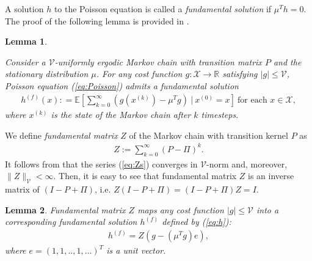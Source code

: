 \documentclass[11pt]{article}
\newcommand{\R}{\mathbb{R}}
\newcommand{\E}{\mathbb{E}}
\newcommand{\X}{\mathcal{X}}
\newcommand{\V}{\mathcal{V}}
\newtheorem{lemma}{Lemma}
\theoremstyle{definition}
\numberwithin{equation}{section}
\begin{document}




A solution $h$ to the Poisson equation is called a \textit{fundamental solution} if   $ \mu^T h =0.$    The proof of the following lemma is provided in \cite[Proposition A.3.11]{Meyn2007}.



\begin{lemma}\label{lem:poisson_sol}

Consider a $\V$-uniformly ergodic  Markov chain with transition matrix $P$ and the stationary  distribution $\mu$.
 For any cost function $g:\X \rightarrow \R$ satisfying $|g|\leq \V$,  Poisson equation (\ref{eq:Poisson}) admits a fundamental  solution
\begin{align}\label{eq:h}
h^{(f)}(x) : = \E \left[\sum\limits_{k=0}^\infty \left(g(x^{(k)}) - \mu^Tg\right)~|~x^{(0)} = x\right] ~\text{for each }x\in \X,
\end{align}
where $x^{(k)}$ is the state of the Markov chain after $k$ timesteps.


\end{lemma}

We  define   \textit{fundamental matrix} $Z$ of the Markov chain with transition kernel $P$ as %
 \begin{align}\label{eq:Zs}Z :=\sum\limits_{k=0}^\infty \left( P-\Pi \right)^k. \end{align}
 It follows from  \cite[Theorem 16.1.2]{Meyn2009} that the series (\ref{eq:Zs}) converges in $\V$-norm and, moreover,  $\|Z\|_\V<\infty$.
Then, it is easy to see that fundamental matrix $Z$ is an inverse matrix of $(I-P+\Pi)$, i.e. $Z(I-P+\Pi) = (I-P+\Pi)Z = I$.

 \begin{lemma}\label{lem:Zeq}
Fundamental matrix $Z$   maps any cost function $|g|\leq \V$ into a corresponding fundamental solution $h^{(f)}$ defined by (\ref{eq:h}):
 \begin{align}h^{(f)} = Z\left(g -(\mu^T g) e\right) ,\end{align}
 where $e = (1, 1,.., 1, ...)^T$ is a unit vector.

 \end{lemma}
\end{document}
